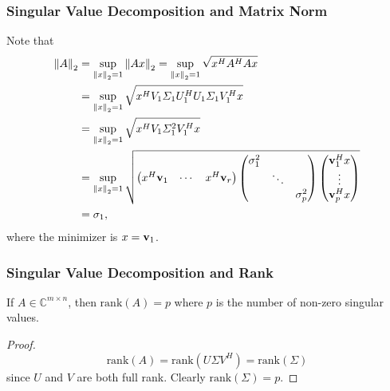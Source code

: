 \documentclass{beamer}
\begin{document}
\begin{frame}\frametitle{Singular Value Decomposition and Matrix Norm}
	Note that
	\begin{align*}
		\left\|A\right\|_2 
			&= \sup_{\left\|x\right\|_2=1}\left\|Ax\right\|_2 
			= \sup_{\left\|x\right\|_2=1}\sqrt{x^HA^HAx}\\
			&= \sup_{\left\|x\right\|_2 = 1}\sqrt{x^HV_1\Sigma_1U_1^H U_1\Sigma_1V_1^Hx}\\
			&= \sup_{\left\|x\right\|_2 = 1}\sqrt{x^HV_1\Sigma_1^2V_1^Hx}\\
			&= \sup_{\left\|x\right\|_2 = 1}
				\sqrt{
					\begin{pmatrix}
		      			x^H\mathbf{v}_1 & \cdots & x^H\mathbf{v}_r
		    		\end{pmatrix}
		    		\begin{pmatrix}
		    			\sigma_1^2 & &\\
		    			& \ddots\\
		    			& & \sigma_p^2
		  			\end{pmatrix}
		  			\begin{pmatrix}
		    			\mathbf{v}_1^Hx\\
		    			\vdots\\
		    			\mathbf{v}_p^Hx
		  			\end{pmatrix}}  \\
		  	&= \sigma_1,
	\end{align*}	
	where the minimizer is $x = \mathbf{v}_1$.

\end{frame}

\begin{frame}\frametitle{Singular Value Decomposition and Rank}
	\begin{lemma}
		If $A \in \mathbb{C}^{m\times n}$, then 
		$\text{rank}(A) = p$ where $p$ is the number of non-zero singular values.
	\end{lemma}
	
	\begin{proof}
		\[ 
			\text{rank}(A) 
			= \text{rank}(U\Sigma V^H) 
			= \text{rank}(\Sigma) 
		\] 
		since $U$ and $V$ are both full rank.  
		Clearly $\text{rank}(\Sigma) = p$.
	\end{proof}
	
	
\end{frame}
\end{document}
